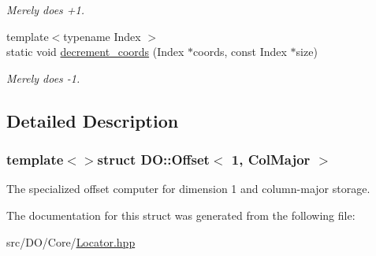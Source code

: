 \begin{DoxyCompactItemize}
\begin{DoxyCompactList}\small\item\em Merely does +1. \end{DoxyCompactList}\item 
\hypertarget{struct_d_o_1_1_offset_3_011_00_01_col_major_01_4_ac1c91b6ec96f5963221003a8cae3d912}{{\footnotesize template$<$typename Index $>$ }\\static void \hyperlink{struct_d_o_1_1_offset_3_011_00_01_col_major_01_4_ac1c91b6ec96f5963221003a8cae3d912}{decrement\-\_\-coords} (Index $\ast$coords, const Index $\ast$size)}\label{struct_d_o_1_1_offset_3_011_00_01_col_major_01_4_ac1c91b6ec96f5963221003a8cae3d912}

\begin{DoxyCompactList}\small\item\em Merely does -\/1. \end{DoxyCompactList}\end{DoxyCompactItemize}


\subsection{Detailed Description}
\subsubsection*{template$<$$>$struct D\-O\-::\-Offset$<$ 1, Col\-Major $>$}

The specialized offset computer for dimension 1 and column-\/major storage. 

The documentation for this struct was generated from the following file\-:\begin{DoxyCompactItemize}
\item 
src/\-D\-O/\-Core/\hyperlink{_locator_8hpp}{Locator.\-hpp}\end{DoxyCompactItemize}
